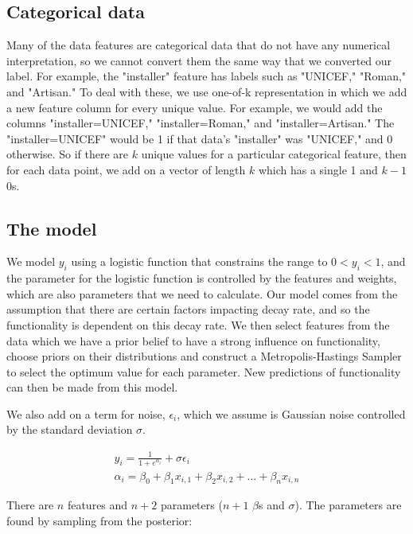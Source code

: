\documentclass{article} %
\begin{document}
\begin{multicols}{2}
\subsection{Categorical data}

Many of the data features are categorical data that do not have any numerical interpretation, so we cannot convert them the same way that we converted our label. For example, the "installer" feature has labels such as "UNICEF," "Roman," and "Artisan." To deal with these, we use one-of-k representation in which we add a new feature column for every unique value. For example, we would add the columns "installer=UNICEF," "installer=Roman," and "installer=Artisan." The "installer=UNICEF" would be 1 if that data's "installer" was "UNICEF," and 0 otherwise. So if there are $k$ unique values for a particular categorical feature, then for each data point, we add on a vector of length $k$ which has a single 1 and $k-1$ 0s.

\subsection{The model}

We model $y_i$ using a logistic function that constrains the range to $0 < y_i < 1$, and the parameter for the logistic function is controlled by the features and weights, which are also parameters that we need to calculate. Our model comes from the assumption that there are certain factors impacting decay rate, and so the functionality is dependent on this decay rate.
We then select features from the data which we have a prior belief to have a strong influence on functionality, choose priors on their distributions and construct a Metropolis-Hastings Sampler to select the optimum value for each parameter. New predictions of functionality can then be made from this model.

We also add on a term for noise, $\epsilon_i$, which we assume is Gaussian noise controlled by the standard deviation $\sigma$.

\begin{gather*}
y_i = \frac{1}{1+e^{\alpha_i}}+\sigma\epsilon_i \\
\alpha_i = \beta_0 + \beta_1 x_{i,1} + \beta_2 x_{i,2} + ... + \beta_n x_{i,n}
\end{gather*}

There are $n$ features and $n+2$ parameters ($n+1$ $\beta$s and $\sigma$). The parameters are found by sampling from the posterior:


\end{multicols}
\end{document}

